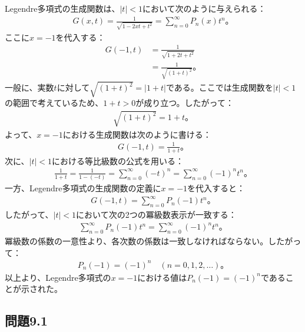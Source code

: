 \documentclass[platex,dvipdfmx,a4paper]{jsarticle}
\begin{document}
  Legendre多項式の生成関数は、$|t|<1$において次のように与えられる：
  \begin{align*}
    G(x,t)
    =\frac{1}{\sqrt{1-2xt+t^2}}
    =\sum_{n=0}^{\infty}P_n(x)t^n。
  \end{align*}
  ここに$x=-1$を代入する：
  \begin{align*}
    G(-1,t)
    &=\frac{1}{\sqrt{1+2t+t^2}}\\
    &=\frac{1}{\sqrt{(1+t)^2}}。
  \end{align*}
  一般に、実数$t$に対して$\sqrt{(1+t)^2}=|1+t|$である。ここでは生成関数を$|t|<1$の範囲で考えているため、$1+t>0$が成り立つ。したがって：
  \begin{align*}
    \sqrt{(1+t)^2}=1+t。
  \end{align*}
  よって、$x=-1$における生成関数は次のように書ける：
  \begin{align*}
    G(-1,t)=\frac{1}{1+t}。
  \end{align*}
  次に、$|t|<1$における等比級数の公式を用いる：
  \begin{align*}
    \frac{1}{1+t}
    =\frac{1}{1-(-t)}
    =\sum_{n=0}^{\infty}(-t)^n
    =\sum_{n=0}^{\infty}(-1)^nt^n。
  \end{align*}
  一方、Legendre多項式の生成関数の定義に$x=-1$を代入すると：
  \begin{align*}
    G(-1,t)=\sum_{n=0}^{\infty}P_n(-1)t^n。
  \end{align*}
  したがって、$|t|<1$において次の2つの冪級数表示が一致する：
  \begin{align*}
    \sum_{n=0}^{\infty}P_n(-1)t^n
    =\sum_{n=0}^{\infty}(-1)^nt^n。
  \end{align*}
  冪級数の係数の一意性より、各次数の係数は一致しなければならない。したがって：
  \begin{align*}
    P_n(-1)=(-1)^n\quad(n=0,1,2,\dots)。
  \end{align*}
  以上より、Legendre多項式の$x=-1$における値は$P_n(-1)=(-1)^n$であることが示された。

  \subsection*{問題9.1}
\end{document}
